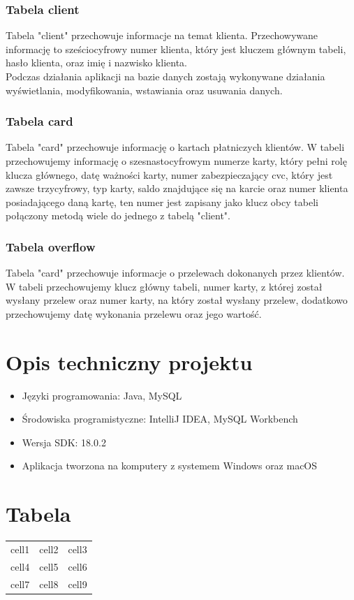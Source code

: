 \documentclass[12pt, letterpaper]{article}
\begin{document}
\subsubsection{Tabela client}

\quad Tabela "client" przechowuje informacje na temat klienta. Przechowywane informację to sześciocyfrowy numer klienta, który jest kluczem głównym tabeli, hasło klienta, oraz imię i nazwisko klienta.\\

\quad Podczas działania aplikacji na bazie danych zostają wykonywane działania wyświetlania, modyfikowania, wstawiania oraz usuwania danych.

\subsubsection{Tabela card}

\quad Tabela "card" przechowuje informację o kartach płatniczych klientów. W tabeli przechowujemy informację o szesnastocyfrowym numerze karty, który pełni rolę klucza głównego, datę ważności karty, numer zabezpieczający cvc, który jest zawsze trzycyfrowy, typ karty, saldo znajdujące się na karcie oraz numer klienta posiadającego daną kartę, ten numer jest zapisany jako klucz obcy tabeli połączony metodą wiele do jednego z tabelą "client".

\subsubsection{Tabela overflow}

\quad Tabela "card"  przechowuje informacje o przelewach dokonanych przez klientów. W tabeli przechowujemy klucz główny tabeli, numer karty, z której został wysłany przelew oraz numer karty, 
na który został wysłany przelew, dodatkowo przechowujemy datę wykonania przelewu oraz jego wartość.

\section{Opis techniczny projektu}
\begin{itemize}
\item Języki programowania: Java, MySQL
\item Środowiska programistyczne: IntelliJ IDEA, MySQL Workbench
\item Wersja SDK: 18.0.2
\item Aplikacja tworzona na komputery z systemem Windows oraz macOS
\end{itemize}

\section{Tabela}

\begin{center}
\begin{tabular}{|c|c|c|}
\hline
cell1 & cell2 & cell3 \\
cell4 & cell5 & cell6 \\
cell7 & cell8 & cell9 \\
\hline
\end{tabular}
\end{center}
\end{document}
